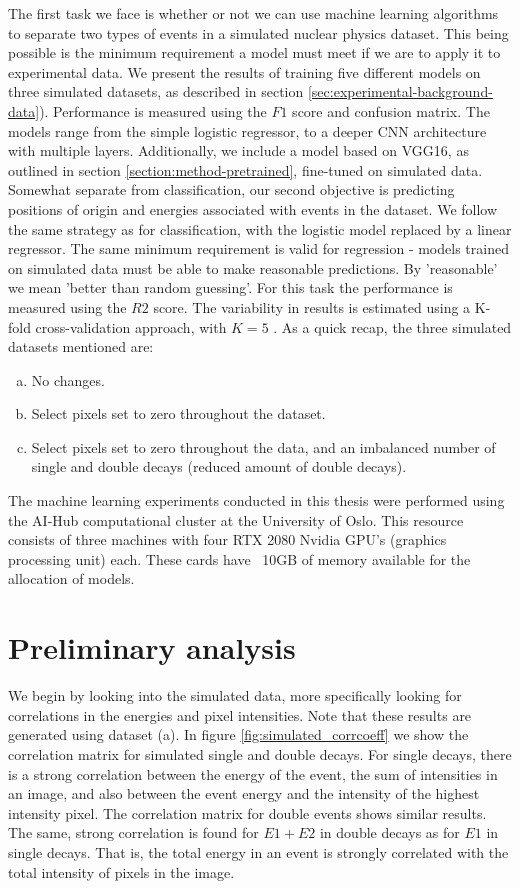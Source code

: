 \noindent The first task we face is whether or not we can use machine learning algorithms to 
separate two types of events in a simulated nuclear physics dataset. This being possible
is the minimum requirement a model must meet if we are to apply it to experimental data.
We present the results of training five different models on three simulated 
datasets, as described in section \ref{sec:experimental-background-data}).
Performance is measured using the $F1$ score and confusion matrix. The models range from
the simple logistic regressor, to a deeper CNN architecture with multiple layers. Additionally,
we include a model based on VGG16, as outlined in section \ref{section:method-pretrained},
fine-tuned on simulated data. Somewhat separate from classification, our second objective
is predicting positions of origin and energies associated with events in the dataset.
We follow the same strategy as for classification, with the logistic model replaced by a linear
regressor. The same minimum requirement is valid for regression - models trained on simulated data
must be able to make reasonable predictions. By 'reasonable' we mean 'better than random guessing'.
For this task the performance is measured using the $R2$ score. The variability in results is 
estimated using a K-fold cross-validation approach, with $K = 5$ \cite{Stone1974}.
As a quick recap, the three simulated datasets mentioned are:
\begin{enumerate}[a)]
    \item No changes.
    \item Select pixels set to zero throughout the dataset.
    \item Select pixels set to zero throughout the data, and an imbalanced number of single
    and double decays (reduced amount of double decays).
\end{enumerate}

\noindent The machine learning experiments conducted in this thesis were performed
using the AI-Hub computational cluster at the University of Oslo. This resource 
consists of three machines with four RTX 2080 Nvidia GPU’s (graphics
processing unit) each. These cards have ~10GB of memory available for the
allocation of models.

\section{Preliminary analysis}
We begin by looking into the simulated data, more specifically looking for correlations
in the energies and pixel intensities. Note that these results are generated using
dataset (a). In figure \ref{fig:simulated_corrcoeff} we show
the correlation matrix for simulated single and double decays. For single decays, there
is a strong correlation between the energy of the event, the sum of intensities in an image,
and also between the event energy and the intensity of the highest intensity pixel.
The correlation matrix for double events shows similar results. The same, strong correlation
is found for $E1 + E2$ in double decays as for $E1$ in single decays. That is, the total energy
in an event is strongly correlated with the total intensity of pixels in the image.


